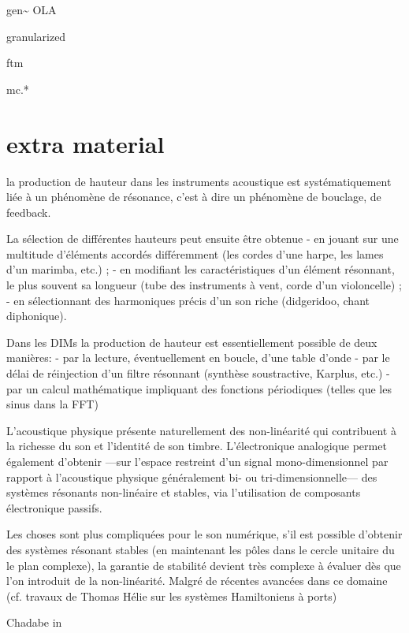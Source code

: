 gen\textasciitilde{ } OLA

granularized

ftm

mc.*


\section*{extra material}

la production de hauteur dans les instruments acoustique est systématiquement liée à un phénomène de résonance, c'est à dire un phénomène de bouclage, de feedback. 

La sélection de différentes hauteurs peut ensuite être obtenue 
- en jouant sur une multitude d'éléments accordés différemment (les cordes d'une harpe, les lames
d'un marimba, etc.) ;
- en modifiant les caractéristiques d'un élément résonnant, le plus souvent sa longueur (tube des
instruments à vent, corde d'un violoncelle) ;
- en sélectionnant des harmoniques précis d'un son riche (didgeridoo, chant diphonique).


Dans les DIMs la production de hauteur est essentiellement possible de deux manières: 
- par la lecture, éventuellement en boucle, d'une table d'onde
- par le délai de réinjection d'un filtre résonnant (synthèse soustractive, Karplus, etc.)
- par un calcul mathématique impliquant des fonctions périodiques (telles que les sinus dans la FFT)

L'acoustique physique présente naturellement des non-linéarité qui contribuent à la richesse du son et l'identité de son timbre. L'électronique analogique permet également d'obtenir —sur l'espace restreint d'un signal mono-dimensionnel par rapport à l'acoustique physique généralement bi- ou tri-dimensionnelle— des systèmes résonants non-linéaire et stables, via l'utilisation de composants électronique passifs.

Les choses sont plus compliquées pour le son numérique, s'il est possible d'obtenir des systèmes résonant stables (en maintenant les pôles dans le cercle unitaire du le plan complexe), la garantie de stabilité devient très complexe à évaluer dès que l'on introduit de la non-linéarité.
Malgré de récentes avancées dans ce domaine (cf. travaux de Thomas Hélie sur les systèmes Hamiltoniens à ports)


 Chadabe in \cite{chadabe_limitations_2002}